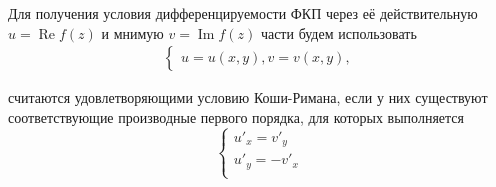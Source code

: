 
\begin{col-answer-preambule}
\end{col-answer-preambule}

Для получения условия дифференцируемости ФКП через её действительную $u = \operatorname{Re}f(z)$ и
мнимую $v = \operatorname{Im}f(z)$ части будем использовать 
\begin{align*}
  \begin{cases}
    u = u(x, y),
    v = v(x, y),
  \end{cases}
\end{align*}

считаются удовлетворяющими условию Коши-Римана, если у них существуют соответствующие производные
первого порядка, для которых выполняется
\begin{equation}
  \begin{cases}
    \label{eq:lecture16-08}
    u'_x = v'_y\\
    u'_y = -v'_x\\
  \end{cases}
\end{equation}


